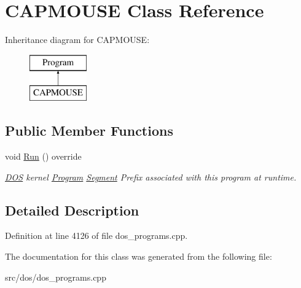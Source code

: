 \hypertarget{classCAPMOUSE}{\section{C\-A\-P\-M\-O\-U\-S\-E Class Reference}
\label{classCAPMOUSE}
}
Inheritance diagram for C\-A\-P\-M\-O\-U\-S\-E\-:\begin{figure}[H]
\begin{center}
\leavevmode
\includegraphics[height=2.000000cm]{classCAPMOUSE}
\end{center}
\end{figure}
\subsection*{Public Member Functions}
\begin{DoxyCompactItemize}
\item 
\hypertarget{classCAPMOUSE_a40f8a87bf9027081766fb5e0fc74149a}{void \hyperlink{classCAPMOUSE_a40f8a87bf9027081766fb5e0fc74149a}{Run} () override}\label{classCAPMOUSE_a40f8a87bf9027081766fb5e0fc74149a}

\begin{DoxyCompactList}\small\item\em \hyperlink{classDOS}{D\-O\-S} kernel \hyperlink{classProgram}{Program} \hyperlink{structSegment}{Segment} Prefix associated with this program at runtime. \end{DoxyCompactList}\end{DoxyCompactItemize}


\subsection{Detailed Description}


Definition at line 4126 of file dos\-\_\-programs.\-cpp.



The documentation for this class was generated from the following file\-:\begin{DoxyCompactItemize}
\item 
src/dos/dos\-\_\-programs.\-cpp\end{DoxyCompactItemize}
